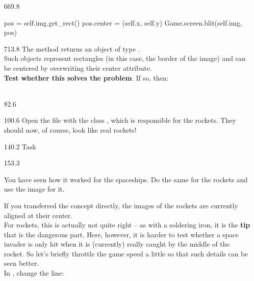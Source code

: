 \documentclass{aslab}
\begin{document}
\begin{region}[x=74.7,right=0,pitch=13.2]{669.8}
\begin{codeblock}
pos = self.img.get_rect()
pos.center = (self.x, self.y)
Game.screen.blit(self.img, pos)
\end{codeblock}
\end{region}

\begin{region}[x=74.7,right=0,pitch=13.45]{713.8}
The  method returns an object of type .\\
Such objects represent rectangles (in this case, the border of the image) and
can be centered by overwriting their center attribute.\\
\textbf{Test whether this solves the problem}. If so, then:\\
\\[-0.4bp]
\end{region}

\nextpage
\begin{region}{82.6}
\end{region}

\begin{region}[pitch=13.2]{100.6}
Open the file  with the class , which is
responsible for the rockets. They should now, of course, look like real
rockets!
\end{region}

\begin{region}{140.2}
Task
\end{region}

\begin{region}[pitch=13.4]{153.3}
\begin{tasks}
\item You have seen how it worked for the spaceships. Do the same for the
  rockets and use the image  for it.
\item If you transferred the concept directly, the images of the rockets are
  currently aligned at their center.\\
  For rockets, this is actually not quite right -- as with a soldering iron,
  it is the \textbf{tip} that is the dangerous part. Here, however, it is
  harder to test whether a space invader is only hit when it is (currently)
  really caught by the middle of the rocket. So let's briefly throttle the
  game speed a little so that such details can be seen better.\\
  In , change the line:
\end{tasks}
\end{region}
\end{document}
